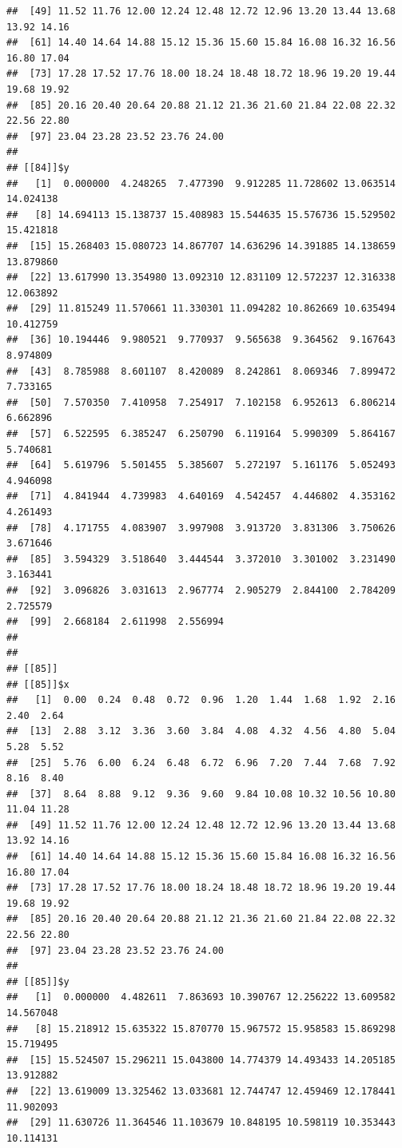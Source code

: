 \documentclass[
  ignorenonframetext,
]{beamer}
\begin{document}
\begin{frame}[fragile]{}
\begin{verbatim}
##  [49] 11.52 11.76 12.00 12.24 12.48 12.72 12.96 13.20 13.44 13.68 13.92 14.16
##  [61] 14.40 14.64 14.88 15.12 15.36 15.60 15.84 16.08 16.32 16.56 16.80 17.04
##  [73] 17.28 17.52 17.76 18.00 18.24 18.48 18.72 18.96 19.20 19.44 19.68 19.92
##  [85] 20.16 20.40 20.64 20.88 21.12 21.36 21.60 21.84 22.08 22.32 22.56 22.80
##  [97] 23.04 23.28 23.52 23.76 24.00
## 
## [[84]]$y
##   [1]  0.000000  4.248265  7.477390  9.912285 11.728602 13.063514 14.024138
##   [8] 14.694113 15.138737 15.408983 15.544635 15.576736 15.529502 15.421818
##  [15] 15.268403 15.080723 14.867707 14.636296 14.391885 14.138659 13.879860
##  [22] 13.617990 13.354980 13.092310 12.831109 12.572237 12.316338 12.063892
##  [29] 11.815249 11.570661 11.330301 11.094282 10.862669 10.635494 10.412759
##  [36] 10.194446  9.980521  9.770937  9.565638  9.364562  9.167643  8.974809
##  [43]  8.785988  8.601107  8.420089  8.242861  8.069346  7.899472  7.733165
##  [50]  7.570350  7.410958  7.254917  7.102158  6.952613  6.806214  6.662896
##  [57]  6.522595  6.385247  6.250790  6.119164  5.990309  5.864167  5.740681
##  [64]  5.619796  5.501455  5.385607  5.272197  5.161176  5.052493  4.946098
##  [71]  4.841944  4.739983  4.640169  4.542457  4.446802  4.353162  4.261493
##  [78]  4.171755  4.083907  3.997908  3.913720  3.831306  3.750626  3.671646
##  [85]  3.594329  3.518640  3.444544  3.372010  3.301002  3.231490  3.163441
##  [92]  3.096826  3.031613  2.967774  2.905279  2.844100  2.784209  2.725579
##  [99]  2.668184  2.611998  2.556994
## 
## 
## [[85]]
## [[85]]$x
##   [1]  0.00  0.24  0.48  0.72  0.96  1.20  1.44  1.68  1.92  2.16  2.40  2.64
##  [13]  2.88  3.12  3.36  3.60  3.84  4.08  4.32  4.56  4.80  5.04  5.28  5.52
##  [25]  5.76  6.00  6.24  6.48  6.72  6.96  7.20  7.44  7.68  7.92  8.16  8.40
##  [37]  8.64  8.88  9.12  9.36  9.60  9.84 10.08 10.32 10.56 10.80 11.04 11.28
##  [49] 11.52 11.76 12.00 12.24 12.48 12.72 12.96 13.20 13.44 13.68 13.92 14.16
##  [61] 14.40 14.64 14.88 15.12 15.36 15.60 15.84 16.08 16.32 16.56 16.80 17.04
##  [73] 17.28 17.52 17.76 18.00 18.24 18.48 18.72 18.96 19.20 19.44 19.68 19.92
##  [85] 20.16 20.40 20.64 20.88 21.12 21.36 21.60 21.84 22.08 22.32 22.56 22.80
##  [97] 23.04 23.28 23.52 23.76 24.00
## 
## [[85]]$y
##   [1]  0.000000  4.482611  7.863693 10.390767 12.256222 13.609582 14.567048
##   [8] 15.218912 15.635322 15.870770 15.967572 15.958583 15.869298 15.719495
##  [15] 15.524507 15.296211 15.043800 14.774379 14.493433 14.205185 13.912882
##  [22] 13.619009 13.325462 13.033681 12.744747 12.459469 12.178441 11.902093
##  [29] 11.630726 11.364546 11.103679 10.848195 10.598119 10.353443 10.114131

\end{verbatim}
\end{frame}
\end{document}
